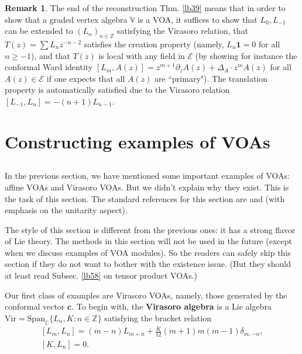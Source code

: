 \documentclass[12pt,a4paper,notitlepage]{article}
\theoremstyle{definition}
\newtheorem{rem}[df]{Remark}
\theoremstyle{plain}
\newcommand{\mc}{\mathcal}
\newcommand{\id}{\mathbf{1}}
\newcommand{\Vir}{\mathrm{Vir}}
\newcommand{\Span}{\mathrm{Span}}
\newcommand{\Vbb}{\mathbb V}
\newcommand{\Cbb}{\mathbb C}
\newcommand{\Zbb}{\mathbb Z}
\newcommand{\cbf}{\mathbf c}
\numberwithin{equation}{section}
\begin{document}
\begin{rem}\label{lb44}
The end of the reconstruction Thm. \ref{lb39} means that in order to show that a graded vertex algebra $\Vbb$ is a VOA, it suffices to show that $L_0,L_{-1}$ can be extended to $(L_n)_{n\in\Zbb}$ satisfying the Virasoro relation, that $T(z)=\sum L_nz^{-n-2}$ satisfies the creation property (namely, $L_n\id=0$ for all $n\geq-1$), and that $T(z)$ is local with any field in $\mc E$ (by showing for instance the conformal Ward identity $[L_m,A(z)]=z^{m+1}\partial_zA(z)+\Delta_A\cdot z^mA(z)$ for all $A(z)\in\mc E$ if one expects that all $A(z)$ are ``primary"). The translation property is automatically satisfied due to the Virasoro relation $[L_{-1},L_n]=-(n+1)L_{n-1}$.
\end{rem}




\section{Constructing examples of VOAs}



\subsection{}
In the previous section, we have mentioned some important examples of VOAs:  affine VOAs and Virasoro VOAs. But we didn't explain why they exist. This is the task of this section. The standard references for this section  are \cite[Chapter 6]{LL} and \cite{Was10} (with emphasis on the unitarity aspect). 

The style of this section is different from the previous ones: it has a strong flavor of Lie theory. The methods in this section will not be used in the future (except when we discuss examples of VOA modules). So the readers can safely skip this section if they do not want to bother with the existence issue. (But they should at least read Subsec. \ref{lb58} on tensor product VOAs.)

Our first class of examples are Virasoro VOAs, namely, those generated by the conformal vector $\cbf$. To begin with, the \textbf{Virasoro algebra} is a Lie algebra $\Vir=\Span_\Cbb\{L_n,K:n\in\Zbb\}$ satisfying the bracket relation
\begin{subequations}
\begin{gather*}
		[L_m,L_n]=(m-n)L_{m+n}+\frac K{12}(m+1)m(m-1)\delta_{m,-n},\\
		[K,L_n]=0.	
\end{gather*}
\end{subequations}
\end{document}
